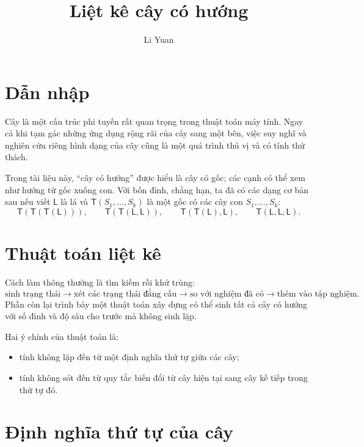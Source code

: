 \documentclass[11pt]{article}
\title{Liệt kê cây có hướng}
\author{Li Yuan}
\date{}
\newcommand{\Leaf}{\mathsf{L}}
\newcommand{\Tree}[1]{\mathsf{T}(#1)}
\begin{document}
\maketitle


\section{Dẫn nhập}

Cây là một cấu trúc phi tuyến rất quan trọng trong thuật toán máy tính. Ngay
cả khi tạm gác những ứng dụng rộng rãi của cây sang một bên, việc suy nghĩ và
nghiên cứu riêng hình dạng của cây cũng là một quá trình thú vị và có tính
thử thách.

Trong tài liệu này, ``cây có hướng'' được hiểu là cây có gốc; các cạnh có thể
xem như hướng từ gốc xuống con. Với bốn đỉnh, chẳng hạn, ta đã có các dạng
cơ bản sau nếu viết \(\Leaf\) là lá và \(\Tree{S_1,\ldots,S_k}\) là một gốc có
các cây con \(S_1,\ldots,S_k\):
\[
  \Tree{\Tree{\Tree{\Leaf}}},\qquad
  \Tree{\Tree{\Leaf,\Leaf}},\qquad
  \Tree{\Tree{\Leaf},\Leaf},\qquad
  \Tree{\Leaf,\Leaf,\Leaf}.
\]

\section{Thuật toán liệt kê}

Cách làm thông thường là tìm kiếm rồi khử trùng:
\[
  \text{sinh trạng thái}
  \longrightarrow
  \text{xét các trạng thái đẳng cấu}
  \longrightarrow
  \text{so với nghiệm đã có}
  \longrightarrow
  \text{thêm vào tập nghiệm}.
\]
Phần còn lại trình bày một thuật toán xây dựng có thể sinh tất cả cây có
hướng với số đỉnh và độ sâu cho trước mà không sinh lặp.

Hai ý chính của thuật toán là:
\begin{itemize}
  \item tính không lặp đến từ một định nghĩa thứ tự giữa các cây;
  \item tính không sót đến từ quy tắc biến đổi từ cây hiện tại sang cây kế
  tiếp trong thứ tự đó.
\end{itemize}

\section{Định nghĩa thứ tự của cây}
\end{document}
